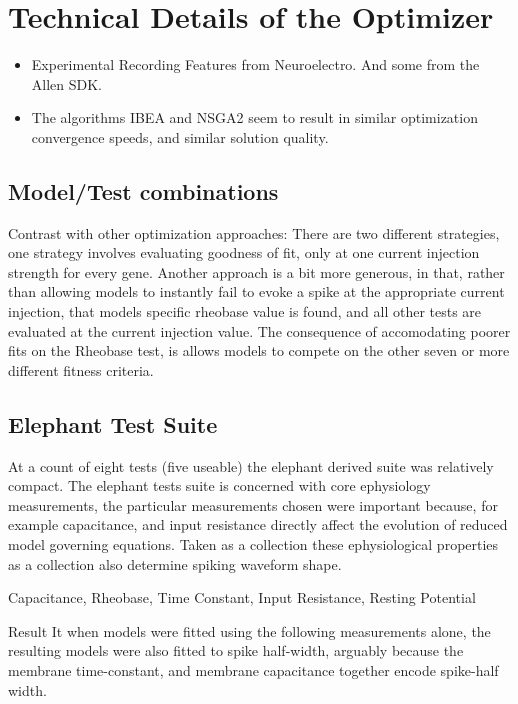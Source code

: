 \section*{Technical Details of the Optimizer}
\begin{itemize}
\item Experimental Recording Features from Neuroelectro. And some from the Allen SDK.
\item The algorithms IBEA and NSGA2 seem to result in similar optimization convergence speeds, and similar solution quality.
\end{itemize}


\subsection{Model/Test combinations}

Contrast with other optimization approaches:
There are two different strategies, one strategy involves evaluating goodness of fit, only at one current injection strength for every gene. Another approach is a bit more generous, in that, rather than allowing models to instantly fail to evoke a spike at the appropriate current injection, that models specific rheobase value is found, and all other tests are evaluated at the current injection value. The consequence of accomodating poorer fits on the Rheobase test, is allows models to compete on the other seven or more different fitness criteria.

\subsection{Elephant Test Suite}
At a count of eight tests (five useable) the elephant derived suite was relatively compact. The elephant tests suite is concerned with core ephysiology measurements, the particular measurements chosen were important because, for example capacitance, and input resistance directly affect the evolution of reduced model governing equations. Taken as a collection these ephysiological properties as a collection also determine spiking waveform shape. 

Capacitance, Rheobase, Time Constant, Input Resistance, Resting Potential

Result It when models were fitted using the following measurements alone, the resulting models were also fitted to spike half-width, arguably because the membrane time-constant, and membrane capacitance together encode spike-half width.

